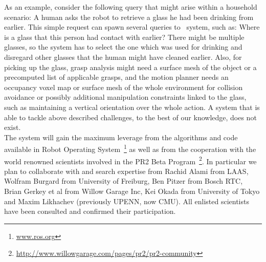 As an example, consider the following query that might arise within a
household scenario: A human asks the robot to retrieve a glass he had
been drinking from earlier. This simple request can spawn several queries to
\ksem\ system, such as: Where is a glass that this person had contact with earlier?
There might be multiple glasses, so the system has to select the one
which was used for drinking and disregard other glasses that the human
might have cleaned earlier. Also, for picking up the glass, grasp
analysis might need a surface mesh of the object or a precomputed list
of applicable grasps, and the motion planner needs an occupancy voxel
map or surface mesh of the whole environment for collision avoidance or
possibly additional manipulation constraints linked to the glass, such
as maintaining a vertical orientation over the whole action.
A system that is able to tackle above described challenges, to the best of our
knowledge, does not exist.\\
The system will gain the maximum leverage from the algorithms and code available
in Robot Operating System~\footnote{\url{www.ros.org}} as well as from the cooperation
with the world renowned scientists involved in the PR2 Beta Program~\footnote{\url{http://www.willowgarage.com/pages/pr2/pr2-community}}.
In particular we plan to collaborate with and search expertise from Rachid Alami from LAAS, Wolfram Burgard
from University of Freiburg, Ben Pitzer from Bosch RTC, Brian Gerkey et al from Willow Garage Inc, 
Kei Okada from University of Tokyo and Maxim Likhachev (previously UPENN, now CMU).
All enlisted scientists have been consulted and confirmed their participation.

